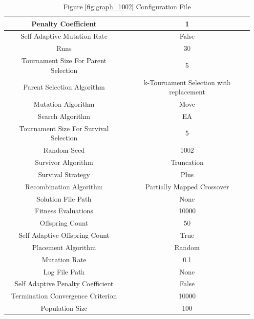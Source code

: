 \documentclass{standalone}
\begin{document}
\begin{table}[!htb]
	\centering
	\caption{Figure \ref{fig:graph_1002} Configuration File}
	\label{tab:graph_1002}
	\begin{tabular}{| c | c |}
		\hline
		Penalty Coefficient		& 1		 \\
		\hline
		Self Adaptive Mutation Rate		& False		 \\
		\hline
		Runs		& 30		 \\
		\hline
		Tournament Size For Parent Selection		& 5		 \\
		\hline
		Parent Selection Algorithm		& k-Tournament Selection with replacement		 \\
		\hline
		Mutation Algorithm		& Move		 \\
		\hline
		Search Algorithm		& EA		 \\
		\hline
		Tournament Size For Survival Selection		& 5		 \\
		\hline
		Random Seed		& 1002		 \\
		\hline
		Survivor Algorithm		& Truncation		 \\
		\hline
		Survival Strategy		& Plus		 \\
		\hline
		Recombination Algorithm		& Partially Mapped Crossover		 \\
		\hline
		Solution File Path		& None		 \\
		\hline
		Fitness Evaluations		& 10000		 \\
		\hline
		Offspring Count		& 50		 \\
		\hline
		Self Adaptive Offspring Count		& True		 \\
		\hline
		Placement Algorithm		& Random		 \\
		\hline
		Mutation Rate		& 0.1		 \\
		\hline
		Log File Path		& None		 \\
		\hline
		Self Adaptive Penalty Coefficient		& False		 \\
		\hline
		Termination Convergence Criterion		& 10000		 \\
		\hline
		Population Size		& 100		 \\
		\hline
	\end{tabular}
\end{table}
\end{document}
